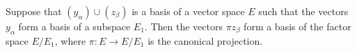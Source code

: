 Suppose that $(y_\alpha) \cup (z_\beta)$ is a basis of a vector space $E$ such that the vectors $y_\alpha$ form a basis of a subspace $E_1$. Then the vectors $\pi z_\beta$ form a basis of the factor space $E/E_1$, where $\pi: E \to E/E_1$ is the canonical projection.
